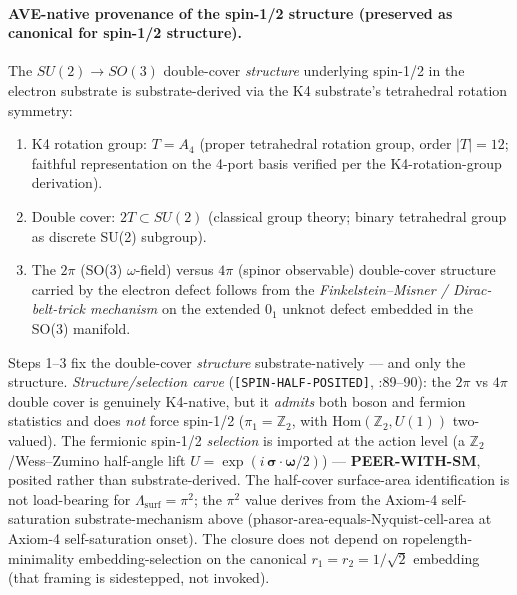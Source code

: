 \paragraph{AVE-native provenance of the spin-1/2 structure (preserved as canonical for spin-1/2 structure).}
The $SU(2) \to SO(3)$ double-cover \emph{structure} underlying spin-1/2 in the electron substrate is substrate-derived via the K4 substrate's tetrahedral rotation symmetry:
\begin{enumerate}
    \item K4 rotation group: $T = A_4$ (proper tetrahedral rotation group, order $\lvert T \rvert = 12$; faithful representation on the 4-port basis verified per the K4-rotation-group derivation).
    \item Double cover: $2T \subset SU(2)$ (classical group theory; binary tetrahedral group as discrete SU(2) subgroup).
    \item The $2\pi$ (SO(3) $\omega$-field) versus $4\pi$ (spinor observable) double-cover structure carried by the electron defect follows from the \emph{Finkelstein--Misner / Dirac-belt-trick mechanism} on the extended $0_1$ unknot defect embedded in the SO(3) manifold.
\end{enumerate}
Steps 1--3 fix the double-cover \emph{structure} substrate-natively --- and only the structure. \emph{Structure/selection carve} (\texttt{[SPIN-HALF-POSITED]}, :89--90): the $2\pi$ vs $4\pi$ double cover is genuinely K4-native, but it \emph{admits} both boson and fermion statistics and does \emph{not} force spin-1/2 ($\pi_1 = \mathbb{Z}_2$, with $\mathrm{Hom}(\mathbb{Z}_2, U(1))$ two-valued). The fermionic spin-1/2 \emph{selection} is imported at the action level (a $\mathbb{Z}_2$/Wess--Zumino half-angle lift $U = \exp(i\,\boldsymbol{\sigma}\cdot\boldsymbol{\omega}/2)$) --- \textbf{PEER-WITH-SM}, posited rather than substrate-derived. The half-cover surface-area identification is not load-bearing for $\Lambda_\text{surf} = \pi^2$; the $\pi^2$ value derives from the Axiom-4 self-saturation substrate-mechanism above (phasor-area-equals-Nyquist-cell-area at Axiom-4 self-saturation onset). The closure does not depend on ropelength-minimality embedding-selection on the canonical $r_1 = r_2 = 1/\sqrt{2}$ embedding (that framing is sidestepped, not invoked).\label{sec:open_rigor}


